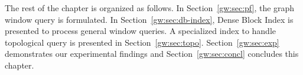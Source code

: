 The rest of the chapter is organized as follows. In Section~\ref{gw:sec:pf}, the graph window query is formulated.
In Section~\ref{gw:sec:db-index}, Dense Block Index is presented to process general window queries. A specialized
index to handle topological query is presented in Section~\ref{gw:sec:topo}. Section~\ref{gw:sec:exp} demonstrates our experimental
findings and Section~\ref{gw:sec:concl} concludes this chapter.  
